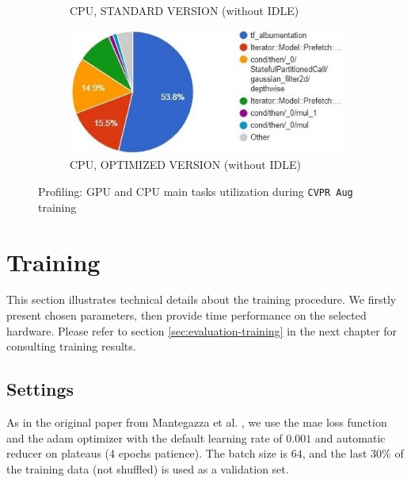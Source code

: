 \begin{figure}[!h]
\begin{center}
\begin{subfigure}[h]{0.49\textwidth}
			\caption[]{CPU, STANDARD VERSION (without IDLE)}
		\end{subfigure}
		\hfill
		\begin{subfigure}[h]{0.49\textwidth}
			\centering
			\includegraphics[width=1\textwidth]{"contents/images/05-profiling-CVPRaug-opt-cpu"}
			\caption[]{CPU, OPTIMIZED VERSION (without IDLE)}
		\end{subfigure}
	\end{center}
	\caption[Profiling: GPU and CPU main tasks utilization during \texttt{CVPR Aug} training]{Profiling: GPU and CPU main tasks utilization during \texttt{CVPR Aug} training}
	\label{fig:profiling-cvpraug-gpu}
\end{figure}




\section{Training}
\label{sec:implementation-training}

This section illustrates technical details about the training procedure. We firstly present chosen parameters, then provide time performance on the selected hardware. Please refer to section \ref{sec:evaluation-training} in the next chapter for consulting training results.



\subsection{Settings}
\label{subsec:training-params}


As in the original paper from Mantegazza et al. \cite{mantegazza2019visionbased}, we use the \gls{mae} loss function and the \gls{adam} optimizer \cite{kingma2014adam} with the default learning rate of $0.001$ and automatic reducer on plateaus (4 epochs patience). The batch size is $64$, and the last 30\% of the training data (not shuffled) is used as a validation set.

